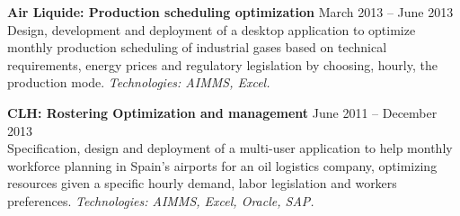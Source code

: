\textbf{Air Liquide: Production scheduling optimization} 
	\hfill March 2013 -- June 2013\\
Design, development and deployment of a desktop application to optimize monthly production scheduling of industrial gases based on technical requirements, energy prices and regulatory legislation by choosing, hourly, the production mode.
\textsl{Technologies: AIMMS, Excel.}

\textbf{CLH: Rostering Optimization and management} 
	\hfill June 2011 -- December 2013\\
Specification, design and deployment of a multi-user application to help monthly workforce planning in Spain's airports for an oil logistics company, optimizing resources given a specific hourly demand, labor legislation and workers preferences.
\textsl{Technologies: AIMMS, Excel, Oracle, SAP.}
